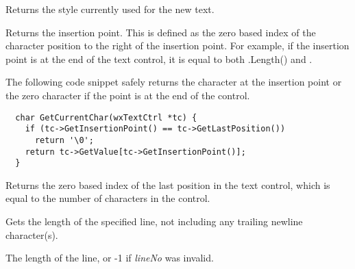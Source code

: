 
Returns the style currently used for the new text.




\label{wxtextctrlgetinsertionpoint}


Returns the insertion point. This is defined as the zero based index of the
character position to the right of the insertion point. For example, if
the insertion point is at the end of the text control, it is equal to
both .Length() and
.

The following code snippet safely returns the character at the insertion
point or the zero character if the point is at the end of the control.

{\small%
\begin{verbatim}
  char GetCurrentChar(wxTextCtrl *tc) {
    if (tc->GetInsertionPoint() == tc->GetLastPosition())
      return '\0';
    return tc->GetValue[tc->GetInsertionPoint()];
  }
\end{verbatim}
}%


\label{wxtextctrlgetlastposition}


Returns the zero based index of the last position in the text control,
which is equal to the number of characters in the control.


\label{wxtextctrlgetlinelength}


Gets the length of the specified line, not including any trailing newline
character(s).




The length of the line, or -1 if {\it lineNo} was invalid.


\label{wxtextctrlgetlinetext}

